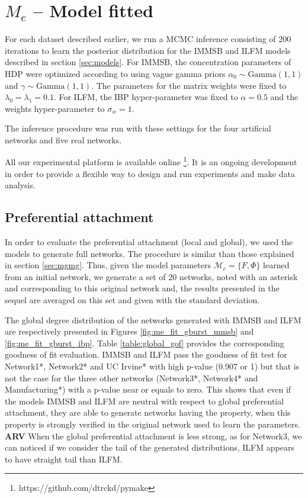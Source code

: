 \documentclass[a4paper, 12pt]{article}
\begin{document}
\section{$M_e$ -- Model fitted}

For each dataset described earlier, we run a MCMC inference consisting of 200 iterations to learn the posterior distribution for the IMMSB and ILFM  models described in section \ref{sec:models}. For IMMSB, the concentration parameters of HDP were optimized according to  \cite{HDP} using vague gamma priors $\alpha_0 \sim \text{Gamma}(1,1)$ and $\gamma \sim \text{Gamma}(1,1)$. The parameters for the matrix weights were fixed to $\lambda_0=\lambda_1=0.1$. For ILFM, the IBP hyper-parameter was fixed to $\alpha=0.5$ and the weights hyper-parameter to $\sigma_w = 1$. 

The inference procedure was run with these settings for the four artificial networks  and five real networks.

All our experimental platform is available online \footnote{https://github.com/dtrckd/pymake}. It is an ongoing development in order to provide a flexible way to design and run experiments and make data analysis.

\subsection{Preferential attachment}

In order to evaluate the preferential attachment (local and global), we used the models to generate full networks. The procedure  is similar than those explained in section \ref{sec:mgmg}. Thus, given the model parameters $\mathcal{M}_e = \{F ,\Phi\}$ learned from an initial network, we generate a set of 20 networks, noted with an asterisk and corresponding to this original network  and, the results presented in the sequel are averaged on this set and given with the standard deviation. 

The global degree distribution of the  networks generated with  IMMSB and ILFM are respectively presented in Figures \ref{fig:me_fit_gburst_mmsb} and \ref{fig:me_fit_gburst_ibp}. Table \ref{table:global_gof} provides  the corresponding goodness of fit evaluation.
IMMSB and ILFM pass the goodness of fit test for Network1*, Network2* and UC Irvine* with high p-value (0.907 or 1) but that is not the case  for the three other networks (Network3*, Network4* and Manufacturing*) with a p-value near or equals to zero. This shows that even if the models IMMSB and ILFM  are neutral with respect to global preferential attachment, they are able to generate  networks having the property,  when this property is strongly verified in the original network used to learn the parameters.
\textbf{ARV} When the global preferential attachment is less strong, as for Network3, we can noticed if we consider the tail of the generated distributions, ILFM appears to have straight tail than ILFM.
\end{document}

